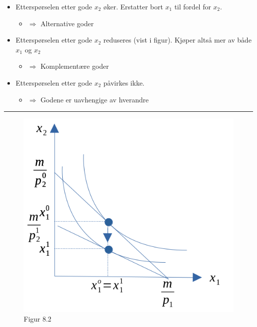 \documentclass[
  letterpaper,
  DIV=11,
  numbers=noendperiod]{scrartcl}
\providecommand{\tightlist}{%
  \setlength{\itemsep}{0pt}\setlength{\parskip}{0pt}}\usepackage{longtable,booktabs,array}
\begin{document}
\begin{itemize}
\tightlist
\item
  Etterspørselen etter gode \(x_2\) øker. Erstatter bort \(x_1\) til
  fordel for \(x_2\).

  \begin{itemize}
  \tightlist
  \item
    \(\Rightarrow\) Alternative goder
  \end{itemize}
\item
  Etterspørselen etter gode \(x_2\) reduseres (vist i figur). Kjøper
  altså mer av både \(x_1\) og \(x_2\)

  \begin{itemize}
  \tightlist
  \item
    \(\Rightarrow\) Komplementære goder
  \end{itemize}
\item
  Etterspørselen etter gode \(x_2\) påvirkes ikke.

  \begin{itemize}
  \tightlist
  \item
    \(\Rightarrow\) Godene er uavhengige av hverandre
  \end{itemize}
\end{itemize}

\begin{center}\rule{0.5\linewidth}{0.5pt}\end{center}

\begin{figure}[H]

{\centering \includegraphics[width=1\textwidth,height=\textheight]{drawio/kryssel.png}

}

\caption{Figur 8.2}

\end{figure}%
\end{document}
